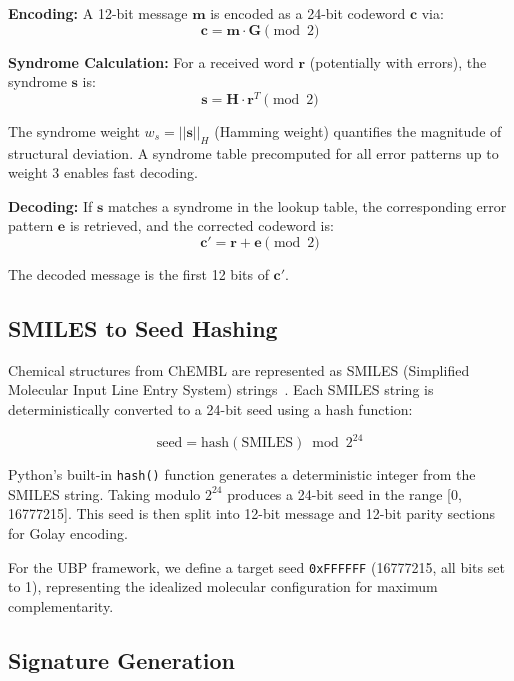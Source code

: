 \documentclass[12pt,a4paper]{article}
\begin{document}
\textbf{Encoding:} A 12-bit message $\mathbf{m}$ is encoded as a 24-bit codeword $\mathbf{c}$ via:
\begin{equation}
\mathbf{c} = \mathbf{m} \cdot \mathbf{G} \pmod{2}
\end{equation}

\textbf{Syndrome Calculation:} For a received word $\mathbf{r}$ (potentially with errors), the syndrome $\mathbf{s}$ is:
\begin{equation}
\mathbf{s} = \mathbf{H} \cdot \mathbf{r}^T \pmod{2}
\end{equation}

The syndrome weight $w_s = ||\mathbf{s}||_H$ (Hamming weight) quantifies the magnitude of structural deviation. A syndrome table precomputed for all error patterns up to weight 3 enables fast decoding.

\textbf{Decoding:} If $\mathbf{s}$ matches a syndrome in the lookup table, the corresponding error pattern $\mathbf{e}$ is retrieved, and the corrected codeword is:
\begin{equation}
\mathbf{c}' = \mathbf{r} + \mathbf{e} \pmod{2}
\end{equation}

The decoded message is the first 12 bits of $\mathbf{c}'$.

\subsection{SMILES to Seed Hashing}

Chemical structures from ChEMBL are represented as SMILES (Simplified Molecular Input Line Entry System) strings~\cite{ChEMBL2024}. Each SMILES string is deterministically converted to a 24-bit seed using a hash function:

\begin{equation}
\text{seed} = \text{hash}(\text{SMILES}) \bmod 2^{24}
\end{equation}

Python's built-in \texttt{hash()} function generates a deterministic integer from the SMILES string. Taking modulo $2^{24}$ produces a 24-bit seed in the range [0, 16777215]. This seed is then split into 12-bit message and 12-bit parity sections for Golay encoding.

For the UBP framework, we define a target seed \texttt{0xFFFFFF} (16777215, all bits set to 1), representing the idealized molecular configuration for maximum complementarity.

\subsection{Signature Generation}
\end{document}
